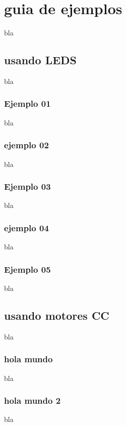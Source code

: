 \documentclass[letterpaper,10pt,english]{sphinxmanual}
\begin{document}
\chapter{guia de ejemplos}
\label{ejemplos:guia-de-ejemplos}\label{ejemplos::doc}
bla


\section{usando LEDS}
\label{ejemplos:usando-leds}
bla


\subsection{Ejemplo 01}
\label{ejemplos:ejemplo-01}
bla


\subsection{ejemplo 02}
\label{ejemplos:ejemplo-02}
bla


\subsection{Ejemplo 03}
\label{ejemplos:ejemplo-03}
bla


\subsection{ejemplo 04}
\label{ejemplos:ejemplo-04}
bla


\subsection{Ejemplo 05}
\label{ejemplos:ejemplo-05}
bla


\section{usando motores CC}
\label{ejemplos:usando-motores-cc}
bla


\subsection{hola mundo}
\label{ejemplos:hola-mundo}
bla


\subsection{hola mundo 2}
\label{ejemplos:hola-mundo-2}
bla
\end{document}
